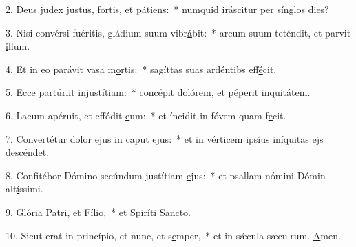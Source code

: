 2. Deus judex justus, fortis, et p\uline{á}tiens:~* numquid iráscitur per sínglos d\uline{i}es?\par 
3. Nisi convérsi fuéritis, gládium suum vibr\uline{á}bit:~* arcum suum teténdit, et parvit \uline{i}llum.\par 
4. Et in eo parávit vasa m\uline{o}rtis:~* sagíttas suas ardéntibs eff\uline{é}cit.\par 
5. Ecce partúriit injust\uline{í}tiam:~* concépit dolórem, et péperit inquit\uline{á}tem.\par 
6. Lacum apéruit, et effódit \uline{e}um:~* et íncidit in fóvem quam f\uline{e}cit.\par 
7. Convertétur dolor ejus in caput \uline{e}jus:~* et in vérticem ipsíus iníquitas ejs desc\uline{é}ndet.\par 
8. Confitébor Dómino secúndum justítiam \uline{e}jus:~* et psallam nómini Dómin alt\uline{í}ssimi.\par 
9. Glória Patri, et F\uline{í}lio,~* et Spiríti S\uline{a}ncto.\par 
10. Sicut erat in princípio, et nunc, et s\uline{e}mper,~* et in sǽcula sæculrum. \uline{A}men.\par 
